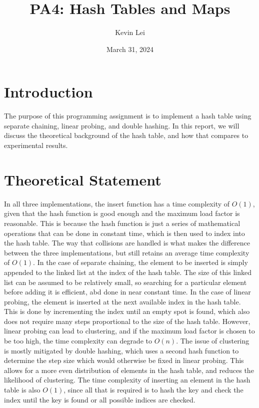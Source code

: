 \documentclass{article}
\title{PA4: Hash Tables and Maps}
\author{Kevin Lei}
\date{March 31, 2024}
\begin{document}
\maketitle

\section{Introduction}
The purpose of this programming assignment is to implement a hash table using separate chaining, linear probing, and double hashing.
In this report, we will discuss the theoretical background of the hash table, and how that compares to experimental results.

\section{Theoretical Statement}
In all three implementations, the insert function has a time complexity of $O(1)$, given that the hash function is good enough and the maximum load factor is reasonable.
This is because the hash function is just a series of mathematical operations that can be done in constant time, which is then used to index into the hash table.
The way that collisions are handled is what makes the difference between the three implementations, but still retains an average time complexity of $O(1)$.
In the case of separate chaining, the element to be inserted is simply appended to the linked list at the index of the hash table.
The size of this linked list can be assumed to be relatively small, so searching for a particular element before adding it is efficient, abd done in near constant time.
In the case of linear probing, the element is inserted at the next available index in the hash table.
This is done by incrementing the index until an empty spot is found, which also does not require many steps proportional to the size of the hash table.
However, linear probing can lead to clustering, and if the maximum load factor is chosen to be too high, the time complexity can degrade to $O(n)$.
The issue of clustering is mostly mitigated by double hashing, which uses a second hash function to determine the step size which would otherwise be fixed in linear probing.
This allows for a more even distribution of elements in the hash table, and reduces the likelihood of clustering.
The time complexity of inserting an element in the hash table is also $O(1)$, since all that is required is to hash the key and check the index until the key is found or all possible indices are checked.
\end{document}
